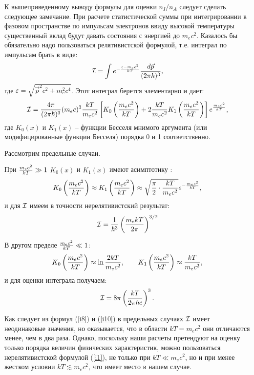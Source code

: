К вышеприведенному выводу формулы для оценки $n_I/n_A$ следует сделать следующее замечание.
При расчете статистической суммы при интегрировании в фазовом пространстве по
импульсам электронов ввиду высокой температуры существенный вклад будут давать
состояния с энергией до $m_ec^2$. Казалось бы обязательно надо пользоваться релятивистской
формулой, т.е.  интеграл по импульсам брать в виде:
\begin{eqnarray}\label{i5}
{\cal I}=\int e^{-{{ \varepsilon -m_ec^2}\over kT}} {{d\vec p}\over{(2\pi \hbar)^3}},
\end{eqnarray}
где $\varepsilon=\sqrt{\vec p^2 c^2 + m_e^2c^4}$.
Этот интеграл берется элементарно и дает:
\begin{eqnarray}\label{i6}
{\cal I}={4\pi \over {(2\pi \hbar)^3} } (m_ec)^3 {kT\over {m_ec^2}}\left [K_0 \left ({m_ec^2\over kT}\right )+
2 {kT\over {m_ec^2}} K_1 \left ({m_ec^2\over kT}\right ) \right ] e^{{m_ec^2\over kT}},
\end{eqnarray}
где $K_0(x)$ и $K_1(x)$ -- функции Бесселя мнимого аргумента (или модифицированные
функции Бесселя)  порядка 0 и 1 соответственно.

Рассмотрим предельные случаи.

При ${m_ec^2\over kT} \gg 1$ $K_0(x)$ и $K_1(x)$ имеют асимптотику \cite{gr_r}:
\begin{eqnarray}\label{i7}
K_0 \left ({m_ec^2\over kT}\right )\approx K_1\left ({m_ec^2\over kT}\right) \approx \sqrt{{\pi\over 2}\cdot {{kT\over {m_ec^2}}}} e^{-{m_ec^2\over kT}},
\end{eqnarray}
и для ${\cal I}$ имеем в точности нерелятивистский результат:
\begin{equation}\label{i8}
{\cal I}={1\over \hbar^3}\left({m_ekT\over 2\pi}\right)^{3/2}
\end{equation}

В другом пределе ${m_ec^2\over kT} \ll 1$:
\begin{equation}\label{i9}
K_0\left ({m_ec^2\over kT}\right ) \approx \ln{2kT \over m_ec^2},
\qquad K_1\left ({m_ec^2\over kT}\right )\approx {kT \over m_ec^2},
\end{equation}
и для оценки интеграла получаем:
\begin{equation}\label{i10}
{\cal I}=8 \pi\left({kT\over 2\pi\hbar c}\right)^3.
\end{equation}

Как следует из формул (\ref{i8}) и (\ref{i10})  в предельных случаях ${\cal I}$  имеет неодинаковые значения,
но оказывается, что в области $kT=m_ec^2$ они отличаются
менее, чем в два раза. Однако, поскольку наши расчеты
претендуют на оценку  только
порядка величин физических характеристик,  можно пользоваться нерелятивистской
формулой (\ref{i1}), не только при
$kT\ll m_ec^2$, но и при менее жестком условии
$kT\lesssim m_ec^2$, что имеет место в нашем случае.

